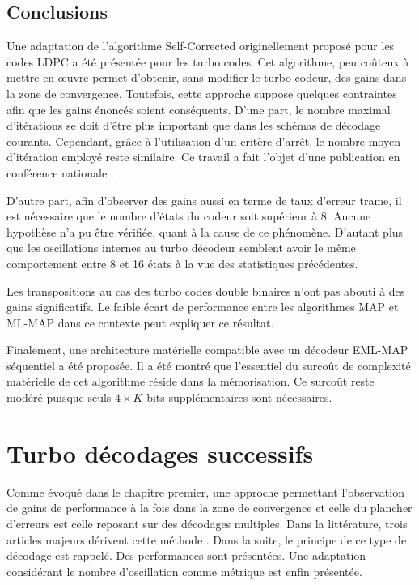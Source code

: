 \subsection{Conclusions}
Une adaptation de l'algorithme Self-Corrected originellement proposé pour les codes LDPC a été présentée pour les turbo 
codes. Cet algorithme, peu coûteux à mettre en œuvre permet d'obtenir, sans modifier le turbo codeur, des gains dans la zone 
de convergence. Toutefois, cette approche suppose quelques contraintes afin que les gains énoncés soient
 conséquents. D'une part, le nombre maximal d'itérations se doit d'être plus important que dans les schémas de 
 décodage courants. Cependant, grâce à l'utilisation d'un critère d'arrêt, le nombre moyen d'itération employé reste 
 similaire. Ce travail a fait l'objet d'une publication en conférence nationale .

 D'autre part, afin d'observer des gains aussi en terme de taux d'erreur trame, il est nécessaire que le 
 nombre d'états du codeur soit supérieur à 8. Aucune hypothèse n'a pu être vérifiée, quant à la cause de ce phénomène. 
 D'autant plus que les oscillations internes au 
turbo décodeur semblent avoir le même comportement entre 8 et 16 états à la vue des statistiques précédentes. 

Les transpositions au cas des turbo codes double binaires n'ont pas abouti à des gains significatifs. Le faible écart de 
performance entre les algorithmes MAP et ML-MAP dans ce contexte peut expliquer ce résultat.

Finalement, une architecture matérielle compatible avec un décodeur EML-MAP séquentiel a été proposée. Il a été montré 
que l'essentiel du surcoût de complexité matérielle de cet algorithme réside dans la mémorisation. Ce surcoût reste modéré puisque 
seuls $4\times K$ bits supplémentaires sont nécessaires.

\section{Turbo décodages successifs}
Comme évoqué dans le chapitre premier, une approche permettant l'observation de gains de performance à la fois dans la 
zone de convergence et celle du plancher d'erreurs est celle reposant sur des décodages multiples. Dans la littérature, trois 
articles majeurs dérivent cette méthode \cite{cim,fsm,pflet}. Dans la suite, le principe de ce type de décodage est rappelé. 
Des performances sont présentées. Une adaptation considérant le nombre d'oscillation comme métrique est enfin présentée.

